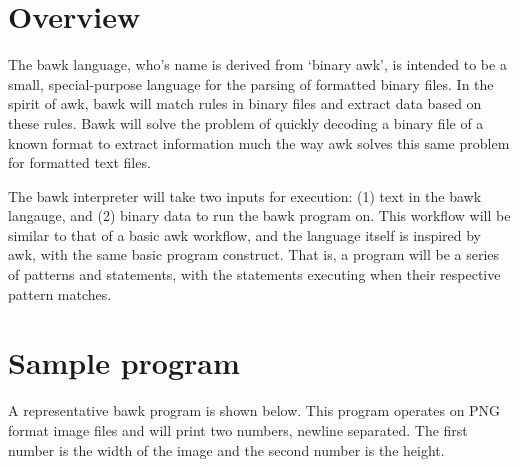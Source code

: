 \section{Overview}
The bawk language, who's name is derived from `binary awk', is intended to be a small, special-purpose language for the parsing of formatted binary files.  In the spirit of awk, bawk will match rules in binary files and extract data based on these rules.  Bawk will solve the problem of quickly decoding a binary file of a known format to extract information much the way awk solves this same problem for formatted text files.

The bawk interpreter will take two inputs for execution: (1) text in the bawk langauge, and (2) binary data to run the bawk program on.  This workflow will be similar to that of a basic awk workflow, and the language itself is inspired by awk, with the same basic program construct.  That is, a program will be a series of patterns and statements, with the statements executing when their respective pattern matches.

\section{Sample program}
\label{sec:sample-program}
A representative bawk program is shown below.  This program operates on PNG format image files and will print two numbers, newline separated.  The first number is the width of the image and the second number is the height. 

